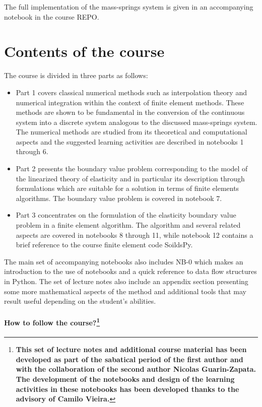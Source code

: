 The full implementation of the mass-springs system is given in an accompanying notebook in the course REPO.
\newpage
\section*{Contents of the course}
The course is divided in three parts as follows:

\begin{itemize}
\item Part 1 covers classical numerical methods such as interpolation theory and numerical integration within the context of finite element methods. These methods are shown to be fundamental in the conversion of the continuous system into a discrete system analogous to the discussed mass-springs system. The numerical methods are studied from its theoretical and computational aspects and the suggested learning activities are described in notebooks 1 through 6.

\item Part 2 presents the boundary value problem corresponding to the model of the linearized theory of elasticity and in particular its description through formulations which are suitable for a solution in terms of finite elements algorithms. The boundary value problem is covered in notebook 7.

\item Part 3 concentrates on the formulation of the elasticity boundary value problem in a finite element algorithm. The algorithm and several related aspects are covered in notebooks 8 through 11, while notebook 12 contains a brief reference to the course finite element code SoildsPy.
\end{itemize}

The main set of accompanying notebooks also includes NB-0 which makes an introduction to the use of notebooks and a quick reference to data flow structures in Python. The set of lecture notes also include an appendix section presenting some more mathematical aspects of the method and additional tools that may result useful depending on the student's abilities.


\paragraph*{How to follow the course?\footnote{{\bf This set of lecture notes and additional course material has been developed as part of the sabatical period of the first author and with the collaboration of the second author Nicolas Guarin-Zapata. The development of the notebooks and design of the learning activities in these notebooks has been developed thanks to the advisory of Camilo Vieira.}}}

